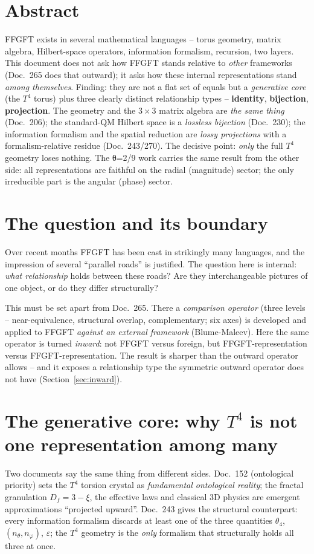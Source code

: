 \section*{Abstract}
FFGFT exists in several mathematical languages -- torus geometry, matrix algebra, Hilbert-space
operators, information formalism, recursion, two layers. This document does not ask how FFGFT
stands relative to \emph{other} frameworks (Doc.~265 does that outward); it asks how these internal
representations stand \emph{among themselves}. Finding: they are not a flat set of equals but a
\emph{generative core} (the $T^4$ torus) plus three clearly distinct relationship types --
\textbf{identity}, \textbf{bijection}, \textbf{projection}. The geometry and the $3\times3$ matrix
algebra are \emph{the same thing} (Doc.~206); the standard-QM Hilbert space is a \emph{lossless
bijection} (Doc.~230); the information formalism and the spatial reduction are \emph{lossy
projections} with a formalism-relative residue (Doc.~243/270). The decisive point: \emph{only} the
full $T^4$ geometry loses nothing. The θ=2/9 work carries the same result from the other side: all
representations are faithful on the radial (magnitude) sector; the only irreducible part is the
angular (phase) sector.

\section{The question and its boundary}
Over recent months FFGFT has been cast in strikingly many languages, and the impression of several
\enquote{parallel roads} is justified. The question here is internal: \emph{what relationship} holds
between these roads? Are they interchangeable pictures of one object, or do they differ structurally?

This must be set apart from Doc.~265. There a \emph{comparison operator} (three levels --
near-equivalence, structural overlap, complementary; six axes) is developed and applied to FFGFT
\emph{against an external framework} (Blume-Maleev). Here the same operator is turned \emph{inward}:
not FFGFT versus foreign, but FFGFT-representation versus FFGFT-representation. The result is sharper
than the outward operator allows -- and it exposes a relationship type the symmetric outward operator
does not have (Section~\ref{sec:inward}).

\section{The generative core: why $T^4$ is not one representation among many}
Two documents say the same thing from different sides. Doc.~152 (ontological priority) sets the
$T^4$ torsion crystal as \emph{fundamental ontological reality}; the fractal granulation
$D_f=3-\xi$, the effective laws and classical 3D physics are emergent approximations
\enquote{projected upward}. Doc.~243 gives the structural counterpart: every information formalism
discards at least one of the three quantities $\theta_4$, $(n_\theta,n_\varphi)$, $\varepsilon$;
the $T^4$ geometry is the \emph{only} formalism that structurally holds all three at once.

